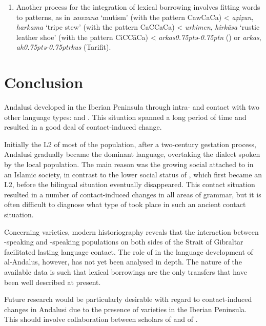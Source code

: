 \documentclass[output=paper,modfonts,nonflat]{langsci/langscibook}
\begin{document}
\begin{enumerate}
\item Another process for the integration of lexical borrowing involves fitting  words to  patterns, as in \textit{zawzana} ‘mutism’ (with the  pattern CawCaCa) < \textit{aẓiẓun}, \textit{harkama} ‘tripe stew’ (with the  pattern CaCCaCa) < \textit{urkimen}, \textit{hirkāsa} ‘rustic leather shoe’ (with the  pattern CiCCāCa) < \textit{arkas\kern 0.75ptǝ\kern -0.75ptn} () or \textit{arkas}, \textit{ah\kern 0.75ptǝ\kern -0.75ptrkus} (Tarifit).
\end{enumerate}


\section{Conclusion}


Andalusi  developed in the Iberian Peninsula through intra-  and contact with two other language types:  and . This situation spanned a long period of time and resulted in a good deal of contact-induced change. 

Initially the L2 of most of the population, after a two-century gestation process, Andalusi  gradually became the dominant language, overtaking the  dialect spoken by the local population. The main reason was the growing social  attached to  in an Islamic society, in contrast to the lower social status of , which first became an L2, before the bilingual situation eventually disappeared. This contact situation resulted in a number of contact-induced changes in all areas of grammar, but it is often difficult to diagnose what type of  took place in such an ancient contact situation. 

Concerning  varieties, modern historiography reveals that the interaction between -speaking and -speaking populations on both sides of the Strait of Gibraltar facilitated lasting language contact. The role of  in the language development of al-Andalus, however, has not yet been analysed in depth. The nature of the available data is such that lexical borrowings are the only transfers that have been well described at present. 

Future research would be particularly desirable with regard to contact-induced changes in Andalusi  due to the presence of  varieties in the Iberian Peninsula. This should involve collaboration between scholars of  and of . 
\end{document}
